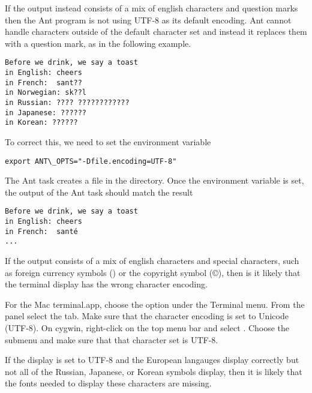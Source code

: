 If the output instead consists of a mix of english characters and question marks
then the Ant program is not using UTF-8 as its default encoding.  Ant cannot handle
characters outside of the default character set and instead it replaces them with
a question mark, as in the following example.
\begin{verbatim}
Before we drink, we say a toast 
in English: cheers  
in French:  sant??
in Norwegian: sk??l
in Russian: ???? ????????????
in Japanese: ??????
in Korean: ??????
\end{verbatim} 
To correct this, we need to set the  environment variable
\begin{verbatim} 
export ANT\_OPTS="-Dfile.encoding=UTF-8"
\end{verbatim}
The Ant  task creates a file  in the 
 directory.
Once the  environment variable is set, the output of the Ant
 task should match the result
\begin{verbatim}
Before we drink, we say a toast
in English: cheers
in French:  santé
...
\end{verbatim}

If the output consists of a mix of english characters and special characters,
such as foreign currency symbols ({\textyen})  or the copyright symbol ({\copyright}),
then is it likely that the terminal display has the wrong character encoding.

For the Mac terminal.app, choose the  option under
the Terminal menu.  From the  panel select the  tab.
Make sure that the character encoding is set to Unicode (UTF-8).
On cygwin, right-click on the top menu bar and select .
Choose the  submenu and make sure that that character set is UTF-8.

If the display is set to UTF-8 and the European langauges display correctly but
not all of the Russian, Japanese, or Korean symbols display, then it is likely
that the fonts needed to display these characters are missing.

